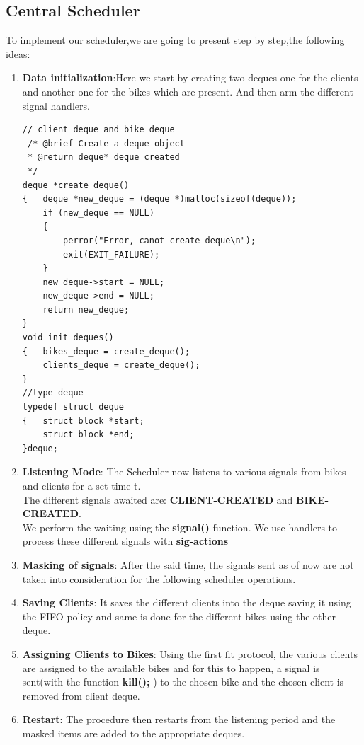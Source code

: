 \subsection{Central Scheduler}
To implement our scheduler,we are going to present step by step,the following ideas:
\begin{enumerate}
  \item \textbf{Data initialization}:Here we start by creating two deques one for the clients and another one for the bikes which are present. And then arm the different signal handlers.
   \begin{lstlisting}[style=customc, caption={creation of deques}]
// client_deque and bike deque
 /* @brief Create a deque object
 * @return deque* deque created
 */
deque *create_deque()
{   deque *new_deque = (deque *)malloc(sizeof(deque));
    if (new_deque == NULL) 
    {
        perror("Error, canot create deque\n");
        exit(EXIT_FAILURE);
    }
    new_deque->start = NULL;
    new_deque->end = NULL;
    return new_deque;
}
void init_deques()
{   bikes_deque = create_deque();
    clients_deque = create_deque();
}
//type deque
typedef struct deque 
{   struct block *start;
    struct block *end;
}deque;

\end{lstlisting}
  
  \item \textbf{Listening Mode}: The Scheduler now listens to various signals from bikes and clients for a set time t.\\
The different signals awaited are: \textbf{CLIENT-CREATED} and \textbf{BIKE-CREATED}.\\We perform the waiting using the \textbf{signal()} function. We use handlers to process these different signals with \textbf{sig-actions}

  \item \textbf{Masking of signals}: After the said time, the signals sent as of now are not taken into consideration for the following scheduler operations.
  
  \item \textbf{Saving Clients}: It saves the different clients into the deque saving it using the FIFO policy and same is done for the different bikes using the other deque.
  
  \item \textbf{Assigning Clients to Bikes}: Using the first fit protocol, the various clients are assigned to the available bikes and for this to happen, a signal is sent(with the function \textbf{kill();} ) to the chosen bike and the chosen client is removed from client deque.
  
  \item \textbf{Restart}: The procedure then restarts from the listening period and the masked items are added to the appropriate deques.
\end{enumerate}


